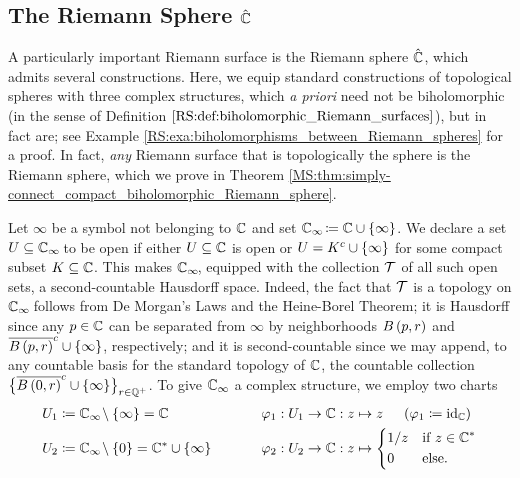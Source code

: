 \documentclass[../Moduli_Spaces_of_Riemann_Surfaces.tex]{subfiles}
\begin{document}
    \subsection{The Riemann Sphere $\hat{\mathbb{C}}$}
    A particularly important Riemann surface is the Riemann sphere $\hat{\mathbb{C}}$, which admits several constructions. Here, we equip standard constructions of topological spheres with three complex structures, which \textit{a priori} need not be biholomorphic (in the sense of Definition $\ref{RS:def:biholomorphic_Riemann_surfaces}$), but in fact are; see Example \ref{RS:exa:biholomorphisms_between_Riemann_spheres} for a proof. In fact, \textit{any} Riemann surface that is topologically the sphere is the Riemann sphere, which we prove in Theorem \ref{MS:thm:simply-connect_compact_biholomorphic_Riemann_sphere}.
    \begin{example}\label{RS:exa:one_point_compactification_of_C}
        Let $\infty$ be a symbol not belonging to $\mathbb{C}$ and set $\mathbb{C}_\infty\!\coloneqq\mathbb{C}\cup\left\{\infty\right\}$. We declare a set $U\subseteq\mathbb{C}_\infty\!$ to be open if either $U\subseteq\mathbb{C}$ is open or $U=K^c\cup\left\{\infty\right\}$ for some compact subset $K\subseteq\mathbb{C}$. This makes $\mathbb{C}_\infty\!$, equipped with the collection $\mathcal{T}$ of all such open sets, a second-countable Hausdorff space. Indeed, the fact that $\mathcal{T}$ is a topology on $\mathbb{C}_\infty\!$ follows from De Morgan's Laws and the Heine-Borel Theorem; it is Hausdorff since any $p\in\mathbb{C}$ can be separated from $\infty$ by neighborhoods $B\left(p,r\right)$ and $\overline{B\left(p,r\right)}^c\cup\left\{\infty\right\}$, respectively; and it is second-countable since we may append, to any countable basis for the standard topology of $\mathbb{C}$, the countable collection $\big\{\overline{B\left(0,r\right)}^c\cup\left\{\infty\right\}\!\big\}_{r\in\mathbb{Q}^+}$. To give $\mathbb{C}_\infty$ a complex structure, we employ two charts
        \begin{equation*}
            \begin{alignedat}{2}
                U_1&\coloneqq\C_\infty\!\comp\l\{\infty\r\}=\C\ \ \ \ \ \ \ \ \ \ \ \ \ \ \ \ \ \ \ \ &&\phi_1:U_1\to\C:z\mapsto z\ \ \ \ \l(\phi_1\coloneqq\id_\C\r) \\
                U_2&\coloneqq\C_\infty\!\comp\l\{0\r\}=\C^\ast\cup\l\{\infty\r\}&&\phi_2:U_2\to\C:z\mapsto
                \begin{dcases}
                    1/z & \textrm{if }z\in\C^\ast \\
                    0 & \textrm{else.}
                \end{dcases}
            \end{alignedat}

\end{equation*}
\end{example}
\end{document}
